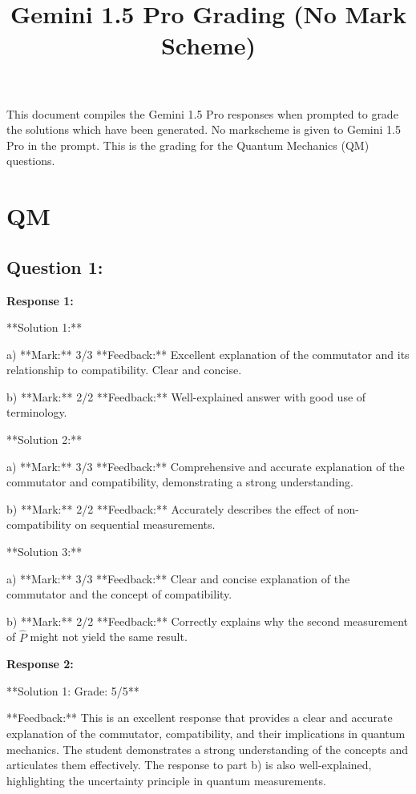 \documentclass[a4paper,11pt]{article}
\title{Gemini 1.5 Pro Grading (No Mark Scheme)}
\begin{document}
\maketitle
This document compiles the Gemini 1.5 Pro responses when prompted to grade the solutions which have been generated. No markscheme is given to Gemini 1.5 Pro in the prompt. This is the grading for the Quantum Mechanics (QM) questions. 

\section{QM}
\subsection*{Question 1:}

\textbf{Response 1:}

**Solution 1:**

a) **Mark:** 3/3 
**Feedback:** Excellent explanation of the commutator and its relationship to compatibility. Clear and concise.

b) **Mark:** 2/2
**Feedback:** Well-explained answer with good use of terminology.

**Solution 2:**

a) **Mark:** 3/3
**Feedback:** Comprehensive and accurate explanation of the commutator and compatibility, demonstrating a strong understanding.

b) **Mark:** 2/2
**Feedback:** Accurately describes the effect of non-compatibility on sequential measurements.

**Solution 3:**

a) **Mark:** 3/3
**Feedback:** Clear and concise explanation of the commutator and the concept of compatibility.

b) **Mark:** 2/2
**Feedback:** Correctly explains why the second measurement of \( \hat{P} \) might not yield the same result.

\bigskip    
\textbf{Response 2:}

**Solution 1: Grade: 5/5**

**Feedback:** This is an excellent response that provides a clear and accurate explanation of the commutator, compatibility, and their implications in quantum mechanics. The student demonstrates a strong understanding of the concepts and articulates them effectively. The response to part b) is also well-explained, highlighting the uncertainty principle in quantum measurements.
\end{document}
